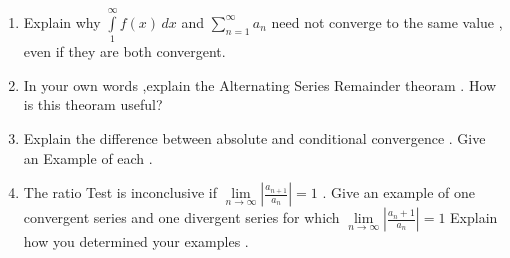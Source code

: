 \documentclass[11pt,legalpaper]{article}  %
\begin{document}
\begin{enumerate}
		\item Explain why $\int\limits_{1}^{\infty}f(x)\,dx$ and $\sum\limits_{n=1}^{\infty} a_n $ need not converge to the same value , even if they are both convergent.   %
		
		\item In your own words ,explain the Alternating Series Remainder theoram . How is this theoram useful?  %
		
		\item Explain the difference between absolute and conditional convergence . Give an Example of each .
		
		\item The ratio Test is inconclusive if $  {\lim \limits_{n \to \infty}}\left|{\frac{a_{n+1}}{a_n}} \right | = 1  $ . Give an example of one convergent series and one divergent series for which $    {\lim \limits_{n \to \infty}} \left | {\frac{a_n + 1 }{a_n}} \right | = 1  $ Explain how you determined your examples .
		
	\end{enumerate}
	
\end{document}
